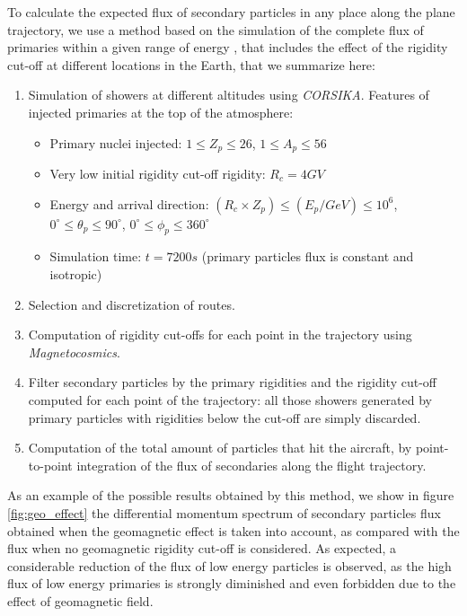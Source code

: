 \documentclass[3p,times,twocolumn]{elsarticle}
\begin{document}
To calculate the expected flux of secondary particles in any place along the
plane trajectory, we use a method based on the simulation of the complete flux
of primaries within a given range of energy \cite{Asorey2011a}, that includes the effect of the rigidity cut-off at different locations in the Earth, that we summarize here: 

\begin{enumerate}[leftmargin=*]
  \item Simulation of showers at different altitudes using \textit{CORSIKA}.
    Features of injected primaries at the top of the atmosphere:
    \begin{itemize}[leftmargin=*]
      \item Primary nuclei injected: $1\leq Z_p\leq 26$, $1\leq A_p\leq 56$
      \item Very low initial rigidity cut-off rigidity: $R_c=4GV$
      \item Energy and arrival direction: $(R_c\times Z_p)\leq (E_p/GeV)\leq
        10^6$, $0^\circ\leq\theta_p\leq 90^\circ$, $0^\circ\leq\phi_p\leq
        360^\circ$
      \item Simulation time: $t=7200 s$ (primary particles flux is constant and
        isotropic)
    \end{itemize}
  \item Selection and discretization of routes.
  \item Computation of rigidity cut-offs for each point in the trajectory using
    \textit{Magnetocosmics}.
  \item Filter secondary particles by the primary rigidities and the rigidity
    cut-off computed for each point of the trajectory: all those showers
    generated by primary particles with rigidities below the cut-off are simply
    discarded.
  \item Computation of the total amount of particles that hit the aircraft, by
    point-to-point integration of the flux of secondaries along the flight
    trajectory.
\end{enumerate}

As an example of the possible results obtained by this method, we show in figure \ref{fig:geo_effect} the differential momentum spectrum of secondary particles
flux obtained when the geomagnetic effect is taken into account, as compared
with the flux when no geomagnetic rigidity cut-off is considered. As expected,
a considerable reduction of the flux of low energy particles is observed, as
the high flux of low energy primaries is strongly diminished and even forbidden
due to the effect of geomagnetic field.
\end{document}
